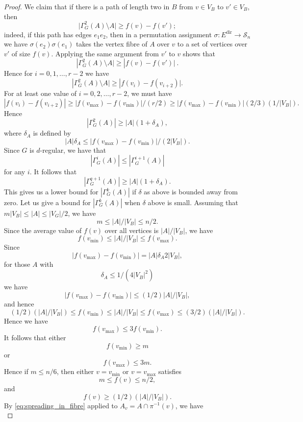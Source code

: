 \documentclass{memo-l}
\theoremstyle{plain}
\theoremstyle{definition}
\numberwithin{section}{chapter}
\numberwithin{equation}{chapter}
\newcommand{\from}{\colon}
\newcommand{\Edir}{E^{\mathrm{dir}}}
\theoremstyle{plain}
\theoremstyle{definition}
\newcommand\cS{\mathcal{S}}
\begin{document}
\begin{proof}
We claim that if there is a path of length two in $B$ from $v\in V_B$ to
$v'\in V_B$, then
$$
|\Gamma^2_G(A)\setminus A\bigr | \ge f(v)-f(v');
$$
indeed, if this path has edges $e_1e_2$, then in a permutation 
assignment $\sigma\from \Edir\to\cS_n$ we have $\sigma(e_2)\sigma(e_1)$
takes the vertex fibre of $A$ over $v$ to a set of vertices over
$v'$ of size $f(v)$.  Applying the same argument from $v'$ to $v$ shows
that
$$
|\Gamma^2_G(A)\setminus A\bigr | \ge |f(v)-f(v')| \ .
$$
Hence for $i=0,1,\ldots,r-2$ we have
$$
|\Gamma^2_G(A)\setminus A\bigr | \ge |f(v_i)-f(v_{i+2})|.
$$
For at least one value of $i=0,2,\ldots,r-2$, we must have
$$
|f(v_i)-f(v_{i+2})| \ge |f(v_{\max})-f(v_{\min})|/(r/2)
\ge |f(v_{\max})-f(v_{\min})|(2/3)(1/|V_B|).
$$
Hence
\begin{equation}\label{eq:first_spreading_bound}
|\Gamma^2_G(A)| \ge |A| (1+ \delta_A),
\end{equation}
where $\delta_A$ is defined by
\begin{equation}\label{eq:delta_A_definition}
|A| \delta_A \le  |f(v_{\max})-f(v_{\min})|/(2|V_B|).
\end{equation}
Since $G$ is $d$-regular, we have that
$$
|\Gamma^{i}_G(A)|
\le |\Gamma^{i+1}_G(A)|
$$
for any $i$.  It follows that 
$$
|\Gamma^{q+1}_G(A)| \ge |A|(1+\delta_A).
$$
This gives us a lower bound for $|\Gamma^k_G(A)|$ if $\delta$ as above
is bounded away from zero.  Let us give a bound for $|\Gamma^k_G(A)|$
when $\delta$ above is small.
Assuming that $m|V_B|\le |A| \le |V_G|/2$, we have
$$
m \le |A|/|V_B| \le n/2.
$$
Since the average value of $f(v)$ over all vertices is $|A|/|V_B|$,
we have
$$
f(v_{\min}) \le |A|/|V_B| \le f(v_{\max}).
$$
Since
$$
|f(v_{\max})-f(v_{\min})| = |A| \delta_A 2 |V_B|,
$$
for those $A$ with 
\begin{equation}\label{eq:delta_A_small}
\delta_A \le 1/(4|V_B|^2) 
\end{equation}
we have
$$
|f(v_{\max})-f(v_{\min})| \le (1/2) |A|/|V_B|,
$$
and hence
\begin{equation}\label{eq:squeeze_f}
(1/2) (|A|/|V_B|) \le f(v_{\min}) \le |A|/|V_B| \le f(v_{\max})
\le (3/2) (|A|/|V_B|) .
\end{equation}
Hence we have
$$
f(v_{\max})\le 3 f(v_{\min}).
$$
It follows that either
$$
f(v_{\min}) \ge m
$$
or 
$$
f(v_{\max}) \le 3m.
$$
Hence if $m\le n/6$, then either $v=v_{\min}$ or $v=v_{\max}$ satisfies
$$
m\le f(v) \le n/2,
$$
and
$$
f(v) \ge (1/2)(|A|/|V_B|).
$$
By \eqref{eq:spreading_in_fibre} applied to $A_v=A\cap\pi^{-1}(v)$, we have
\begin{equation}\label{eq:start_q_even}

\end{equation}
\end{proof}
\end{document}
